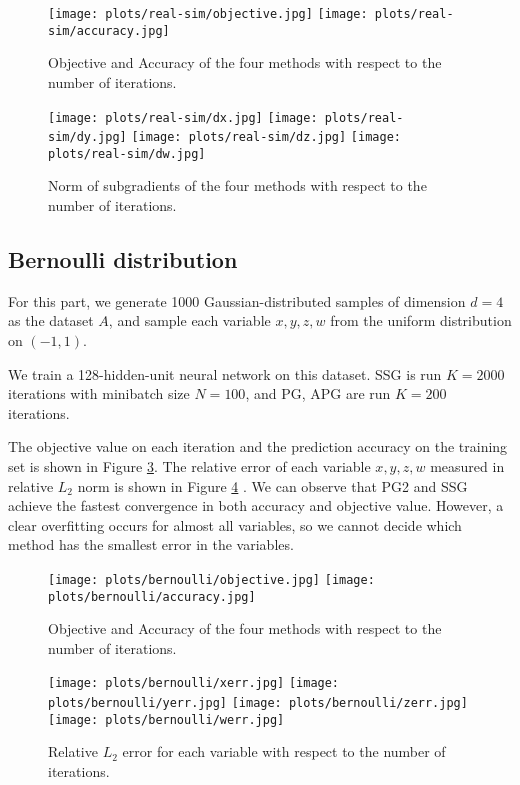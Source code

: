 \documentclass{article}
\numberwithin{equation}{section}
\numberwithin{figure}{section}
\begin{document}
\begin{figure}[h]
\centering
\vbox{
	\texttt{[image: plots/real-sim/objective.jpg]}
	\texttt{[image: plots/real-sim/accuracy.jpg]}
}
\caption{Objective and Accuracy of the four methods with respect to the number of iterations.}
\label{real-sim-obj-acc}
\end{figure}

\begin{figure}[h]
\centering
\vbox{
	\texttt{[image: plots/real-sim/dx.jpg]}
	\texttt{[image: plots/real-sim/dy.jpg]}
	\texttt{[image: plots/real-sim/dz.jpg]}
	\texttt{[image: plots/real-sim/dw.jpg]}
}
\caption{Norm of subgradients of the four methods with respect to the number of iterations.}
\label{real-sim-subgradient}
\end{figure}

\subsection{Bernoulli distribution}
For this part, we generate 1000 Gaussian-distributed samples of dimension $d=4$ as the dataset $A$, and sample each variable $x, y, z, w$ from the uniform distribution on $(-1, 1)$. 

We train a 128-hidden-unit neural network on this dataset. SSG is run $K=2000$ iterations with minibatch size $N = 100$, and PG, APG are run $K = 200$ iterations. 

The objective value on each iteration and the prediction accuracy on the training set is shown in Figure \ref{bernoulli-obj-acc}. The relative error of each variable $x, y, z, w$ measured in relative $L_2 $ norm is shown in Figure \ref{bernoulli-error} . We can observe that PG2 and SSG achieve the fastest convergence in both accuracy and objective value. However, a clear overfitting occurs for almost all variables, so we cannot decide which method has the smallest error in the variables.

\begin{figure}[ht]
\centering
\vbox{
	\texttt{[image: plots/bernoulli/objective.jpg]}
	\texttt{[image: plots/bernoulli/accuracy.jpg]}
}
\caption{Objective and Accuracy of the four methods with respect to the number of iterations.}
\label{bernoulli-obj-acc}
\end{figure}

\begin{figure}[h]
\centering
\vbox{
	\texttt{[image: plots/bernoulli/xerr.jpg]}
	\texttt{[image: plots/bernoulli/yerr.jpg]}
	\texttt{[image: plots/bernoulli/zerr.jpg]}
	\texttt{[image: plots/bernoulli/werr.jpg]}
}
\caption{Relative $L_2 $ error for each variable with respect to the number of iterations.}
\label{bernoulli-error}
\end{figure}
\end{document}

